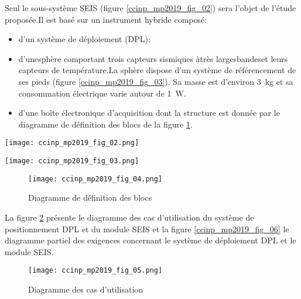  Seul le sous-système SEIS (figure \ref{ccinp_mp2019_fig_02}) sera l’objet de l’étude proposée.Il est basé sur un instrument hybride composé:
\begin{itemize}
\item d'un système de déploiement (DPL);
\item d'unesphère comportant trois capteurs sismiques àtrès largesbandeset leurs capteurs de 
température.La sphère dispose d’un système de référencement de ses pieds (figure \ref{ccinp_mp2019_fig_03}). Sa masse est d'environ \SI{3}{kg} et sa consommation électrique varie autour de \SI{1}{W}.
 \item d'une boîte électronique d'acquisition dont la structure est donnée par le diagramme de 
définition des blocs de la figure \ref{ccinp_mp2019_fig_04}.
\end{itemize}


\begin{minipage}[c]{.47\linewidth}
\begin{center}
\texttt{[image: ccinp\_mp2019\_fig\_02.png]}
\end{center}
\end{minipage} \hfill
\begin{minipage}[c]{.47\linewidth}
\begin{center}
\texttt{[image: ccinp\_mp2019\_fig\_03.png]}
\end{center}
\end{minipage}

\begin{figure}[!h]
\centering
\texttt{[image: ccinp\_mp2019\_fig\_04.png]}
\caption{Diagramme de définition des blocs \label{ccinp_mp2019_fig_04}}
\end{figure}

La figure \ref{ccinp_mp2019_fig_05} présente le diagramme des cas d'utilisation du système de positionnement DPL et du module SEIS et la figure \ref{ccinp_mp2019_fig_06} le diagramme partiel des exigences concernant le système de déploiement DPL et le module SEIS.



\begin{figure}[!h]
\centering
\texttt{[image: ccinp\_mp2019\_fig\_05.png]}
\caption{Diagramme des cas d'utilisation\label{ccinp_mp2019_fig_05}}
\end{figure}

